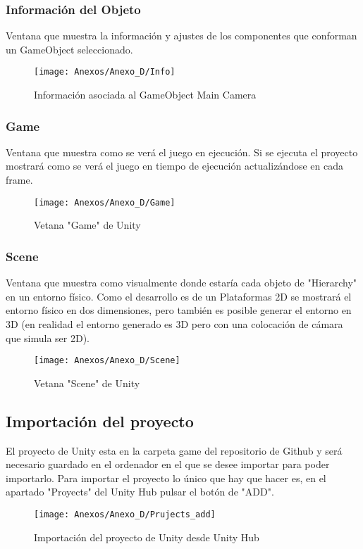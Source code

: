 \subsubsection{Información del Objeto}
Ventana que muestra la información y ajustes de los componentes que conforman un GameObject seleccionado.

\begin{figure}[h]
\centering
\texttt{[image: Anexos/Anexo\_D/Info]}
\caption{Información asociada al GameObject Main Camera}
\end{figure}

\subsubsection{Game}
Ventana que muestra como se verá el juego en ejecución. Si se ejecuta el proyecto mostrará como se verá el juego en tiempo de ejecución actualizándose en cada frame.

\begin{figure}[h]
\centering
\texttt{[image: Anexos/Anexo\_D/Game]}
\caption{Vetana "Game" de Unity}
\end{figure}

\subsubsection{Scene}
Ventana que muestra como visualmente donde estaría cada objeto de "Hierarchy" en un entorno físico. Como el desarrollo es de un Plataformas 2D se mostrará el entorno físico en dos dimensiones, pero también es posible generar el entorno en 3D (en realidad el entorno generado es 3D pero con una colocación de cámara que simula ser 2D).

\clearpage
\begin{figure}[h]
\centering
\texttt{[image: Anexos/Anexo\_D/Scene]}
\caption{Vetana "Scene" de Unity}
\end{figure}

\subsection{Importación del proyecto}
El proyecto de Unity esta en la carpeta game del repositorio de Github y será necesario guardado en el ordenador en el que se desee importar para poder importarlo.
Para importar el proyecto lo único que hay que hacer es, en el apartado "Proyects" del Unity Hub pulsar el botón de "ADD".

\begin{figure}[h]
\centering
\texttt{[image: Anexos/Anexo\_D/Prujects\_add]}
\caption{Importación del proyecto de Unity desde Unity Hub}
\end{figure}
\clearpage

